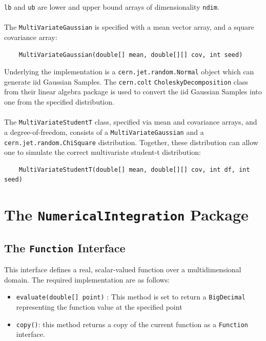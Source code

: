 \texttt{lb} and \texttt{ub} are lower and upper bound arrays of dimensionality \texttt{ndim}.
\\\\
The \texttt{MultiVariateGaussian} is specified with a mean vector array, and a square covariance array:
\begin{lstlisting}
    MultiVariateGaussian(double[] mean, double[][] cov, int seed)
\end{lstlisting}
Underlying the implementation is a \texttt{cern.jet.random.Normal} object which can generate iid Gaussian Samples. The \texttt{cern.colt} \texttt{CholeskyDecomposition} class from their linear algebra package is used to convert the iid Gaussian Samples into one from the specified distribution.
\\\\
The \texttt{MultiVariateStudentT} class, specified via mean and covariance arrays, and a degree-of-freedom, consists of a \texttt{MultiVariateGaussian} and a \texttt{cern.jet.random.ChiSquare} distribution. Together, these distribution can allow one to simulate the correct multivariate student-t distribution:
\begin{lstlisting}
    MultiVariateStudentT(double[] mean, double[][] cov, int df, int seed)
\end{lstlisting}

\section{The \texttt{NumericalIntegration} Package}

\subsection*{The \texttt{Function} Interface}
This interface defines a real, scalar-valued function over a multidimensional domain. The required implementation are as follows:
\begin{itemize}
    \item \texttt{evaluate(double[] point)} : This method is set to return a \texttt{BigDecimal} representing the function value at the specified point
    \item \texttt{copy()}: this method returns a copy of the current function as a \texttt{Function} interface.
\end{itemize}

